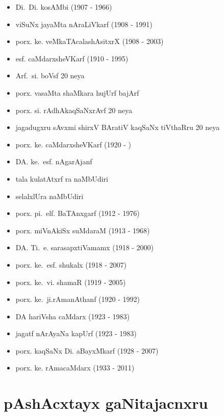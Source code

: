 {\begin{itemize}
\item Di.~Di. kosAMbi {\rm (1907 - 1966)}
\item viSuNx jayaMta nAraLiVkarf {\rm (1908 - 1991)}
\item porx. ke. veMkaTAcalashAsitxrX {\rm (1908 - 2003)}
\item esf. caMdarxsheVKarf {\rm (1910 - 1995)}
\item Arf.~si. boVsf {\rm 20} neya 
\item porx. vasaMta shaMkara hujUrf bajArf
\item porx. si. rAdhAkaqSaNxrAvf {\rm 20} neya
\item jagadugxru sAvxmi shirxV BAratiV kaqSaNx tiVthaRru {\rm 20} neya
\item porx. ke. caMdarxsheVKarf {\rm (1920 - )}
\item DA. ke.~esf. nAgarAjanf
\item tala kulatAtxrf ra naMbUdiri
\item selalxlUra naMbUdiri
\item porx. pi.~elf. BaTAnxgarf {\rm (1912 - 1976)}
\item porx. miVnAkiSx suMdaraM {\rm (1913 - 1968)}
\item DA. Ti.~e. sarasapxtiVamamx {\rm (1918 - 2000)}
\item porx. ke.~esf. shukalx {\rm (1918 - 2007)}
\item porx. ke.~vi. shamaR {\rm (1919 - 2005)}
\item porx. ke.~ji.rAmanAthanf {\rm (1920 - 1992)}
\item DA hariVsha caMdarx {\rm (1923 - 1983)}
\item jagatf nArAyaNa kapUrf {\rm (1923 - 1983)}
\item porx. kaqSaNx Di. aBayxMkarf {\rm (1928 - 2007)}
\item porx. ke. rAmacaMdarx {\rm (1933 - 2011)}
\end{itemize}}

\section*{pAshAcxtayx gaNitajacnxru}

